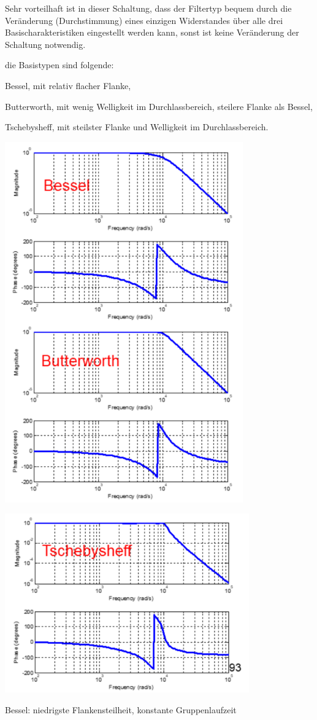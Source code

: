 \documentclass[a4paper]{article}
\begin{document}
\begin{multicols}{3}
\begin{itemize*}
    \item Sehr vorteilhaft ist in dieser Schaltung, dass der Filtertyp bequem durch die Veränderung (Durchstimmung) eines einzigen Widerstandes über alle drei Basischarakteristiken eingestellt werden kann, sonst ist keine Veränderung der Schaltung notwendig.
    \item die Basistypen sind folgende:
    \begin{itemize*}
      \item Bessel, mit relativ flacher Flanke,
      \item Butterworth, mit wenig Welligkeit im Durchlassbereich, steilere Flanke als Bessel,
      \item Tschebysheff, mit steilster Flanke und Welligkeit im Durchlassbereich.
      \item \includegraphics[width=.5\linewidth]{Assets/Biosignalverarbeitung-aktive-filter.png}
      \item \includegraphics[width=.5\linewidth]{Assets/Biosignalverarbeitung-aktive-filter2.png}
      \item Bessel: niedrigste Flankensteilheit, konstante Gruppenlaufzeit

\end{itemize*}
\end{itemize*}
\end{multicols}
\end{document}
